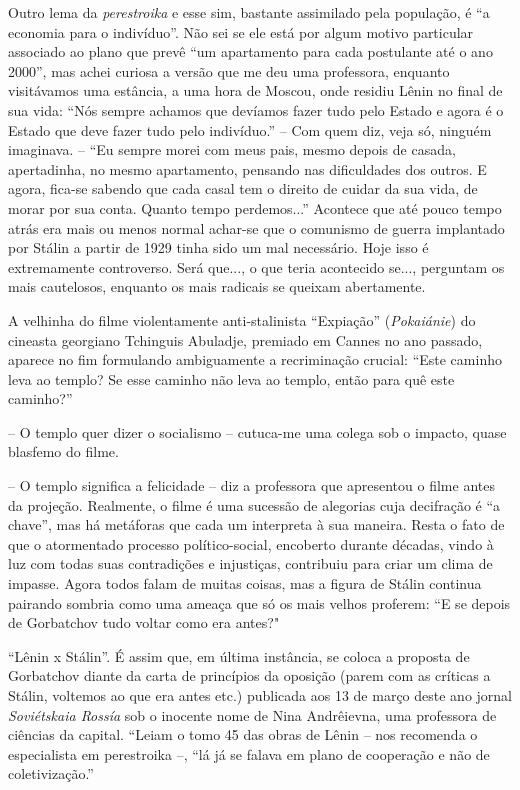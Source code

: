 Outro lema da \emph{perestroika} e esse sim, bastante assimilado pela
população, é ``a economia para o indivíduo''. Não sei se ele está por
algum motivo particular associado ao plano que prevê ``um apartamento
para cada postulante até o ano 2000'', mas achei curiosa a versão que me
deu uma professora, enquanto visitávamos uma estância, a uma hora de
Moscou, onde residiu Lênin no final de sua vida: ``Nós sempre achamos
que devíamos fazer tudo pelo Estado e agora é o Estado que deve fazer
tudo pelo indivíduo.'' -- Com quem diz, veja só, ninguém imaginava. --
``Eu sempre morei com meus pais, mesmo depois de casada, apertadinha, no
mesmo apartamento, pensando nas dificuldades dos outros. E agora,
fica-se sabendo que cada casal tem o direito de cuidar da sua vida, de
morar por sua conta. Quanto tempo perdemos...'' Acontece que até pouco
tempo atrás era mais ou menos normal achar-se que o comunismo de guerra
implantado por Stálin a partir de 1929 tinha sido um mal necessário.
Hoje isso é extremamente controverso. Será que..., o que teria
acontecido se..., perguntam os mais cautelosos, enquanto os mais
radicais se queixam abertamente.

A velhinha do filme violentamente anti-stalinista ``Expiação''
(\emph{Pokaiánie}) do cineasta georgiano Tchinguis Abuladje, premiado em
Cannes no ano passado, aparece no fim formulando ambiguamente a
recriminação crucial: ``Este caminho leva ao templo? Se esse caminho não
leva ao templo, então para quê este caminho?''

-- O templo quer dizer o socialismo -- cutuca-me uma colega sob o
impacto, quase blasfemo do filme.

-- O templo significa a felicidade -- diz a professora que apresentou o
filme antes da projeção. Realmente, o filme é uma sucessão de alegorias
cuja decifração é ``a chave'', mas há metáforas que cada um interpreta à
sua maneira. Resta o fato de que o atormentado processo político-social,
encoberto durante décadas, vindo à luz com todas suas contradições e
injustiças, contribuiu para criar um clima de impasse. Agora todos falam
de muitas coisas, mas a figura de Stálin continua pairando sombria como
uma ameaça que só os mais velhos proferem: ``E se depois de Gorbatchov
tudo voltar como era antes?"

``Lênin x Stálin''. É assim que, em última instância, se coloca a
proposta de Gorbatchov diante da carta de princípios da oposição (parem
com as críticas a Stálin, voltemos ao que era antes etc.) publicada aos
13 de março deste ano jornal \emph{Soviétskaia Rossía} sob o inocente
nome de Nina Andrêievna, uma professora de ciências da capital. ``Leiam
o tomo 45 das obras de Lênin -- nos recomenda o especialista em
perestroika --, ``lá já se falava em plano de cooperação e não de
coletivização.''

